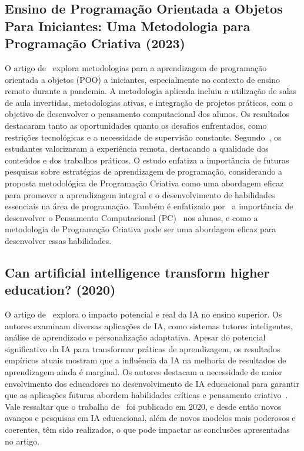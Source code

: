 \documentclass[journal]{IEEEtran}
\begin{document}
\subsection{Ensino de Programação Orientada a Objetos Para Iniciantes: Uma Metodologia para Programação Criativa (2023)}
\noindent%
O artigo de~\cite{giraffa2023ensino} explora metodologias para a aprendizagem de programação orientada a objetos (POO) a iniciantes, especialmente no contexto de ensino remoto durante a pandemia.
A metodologia aplicada incluiu a utilização de salas de aula invertidas, metodologias ativas, e integração de projetos práticos, com o objetivo de desenvolver o pensamento computacional dos alunos.
Os resultados destacaram tanto as oportunidades quanto os desafios enfrentados, como restrições tecnológicas e a necessidade de supervisão constante.
Segundo~\cite{giraffa2023ensino}, os estudantes valorizaram a experiência remota, destacando a qualidade dos conteúdos e dos trabalhos práticos.
O estudo enfatiza a importância de futuras pesquisas sobre estratégias de aprendizagem de programação, considerando a proposta metodológica de Programação Criativa como uma abordagem eficaz para promover a aprendizagem integral e o desenvolvimento de habilidades essenciais na área de programação.
Também é enfatizado por~\cite{giraffa2023ensino} a importância de desenvolver o Pensamento Computacional (PC)~\cite{wing2008computational} nos alunos, e como a metodologia de Programação Criativa pode ser uma abordagem eficaz para desenvolver essas habilidades.

\subsection{Can artificial intelligence transform higher education? (2020)}
\noindent%
O artigo de~\cite{bates2020can} explora o impacto potencial e real da IA no ensino superior.
Os autores examinam diversas aplicações de IA, como sistemas tutores inteligentes, análise de aprendizado e personalização adaptativa.
Apesar do potencial significativo da IA para transformar práticas de aprendizagem, os resultados empíricos atuais mostram que a influência da IA na melhoria de resultados de aprendizagem ainda é marginal.
Os autores destacam a necessidade de maior envolvimento dos educadores no desenvolvimento de IA educacional para garantir que as aplicações futuras abordem habilidades críticas e pensamento criativo~\cite{bates2020can}.
Vale ressaltar que o trabalho de~\cite{bates2020can} foi publicado em 2020, e desde então novos avanços e pesquisas em IA educacional, além de novos modelos mais poderosos e coerentes, têm sido realizados, o que pode impactar as conclusões apresentadas no artigo.
\end{document}
